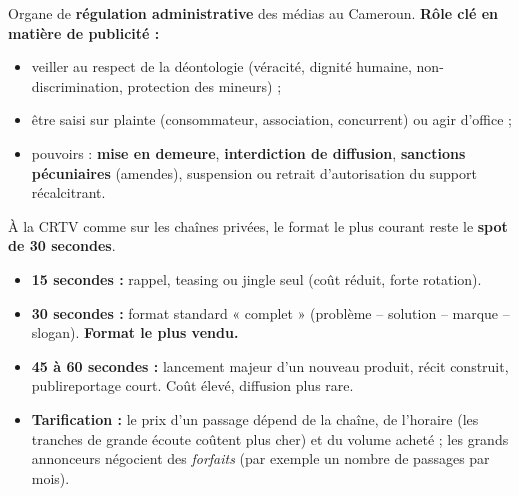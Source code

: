 \documentclass[11pt]{article}
\begin{document}
\begin{definition}
Organe de \textbf{régulation administrative} des médias au Cameroun. \textbf{Rôle clé en matière de publicité :}
\begin{itemize}
    \item veiller au respect de la déontologie (véracité, dignité humaine, non-discrimination, protection des mineurs) ;
    \item être saisi sur plainte (consommateur, association, concurrent) ou agir d'office ;
    \item pouvoirs : \textbf{mise en demeure}, \textbf{interdiction de diffusion}, \textbf{sanctions pécuniaires} (amendes), suspension ou retrait d'autorisation du support récalcitrant.
\end{itemize}
\end{definition}

\begin{exemplebox}
À la CRTV comme sur les chaînes privées, le format le plus courant reste le \textbf{spot de 30 secondes}.
\begin{itemize}
    \item \textbf{15 secondes :} rappel, teasing ou jingle seul (coût réduit, forte rotation).
    \item \textbf{30 secondes :} format standard « complet » (problème – solution – marque – slogan). \textbf{Format le plus vendu.}
    \item \textbf{45 à 60 secondes :} lancement majeur d'un nouveau produit, récit construit, publireportage court. Coût élevé, diffusion plus rare.
    \item \textbf{Tarification :} le prix d'un passage dépend de la chaîne, de l'horaire (les tranches de grande écoute coûtent plus cher) et du volume acheté ; les grands annonceurs négocient des \emph{forfaits} (par exemple un nombre de passages par mois).
\end{itemize}
\end{exemplebox}
\end{document}
